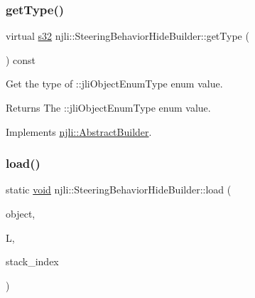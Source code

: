 \mbox{\label{classnjli_1_1_steering_behavior_hide_builder_a12a25b19b54be304480aa0706dd87894}} 
\subsubsection{\texorpdfstring{get\+Type()}{getType()}}
{\footnotesize\ttfamily virtual \mbox{\hyperlink{_util_8h_aa62c75d314a0d1f37f79c4b73b2292e2}{s32}} njli\+::\+Steering\+Behavior\+Hide\+Builder\+::get\+Type (\begin{DoxyParamCaption}{ }\end{DoxyParamCaption}) const\hspace{0.3cm}{\ttfamily [virtual]}}

Get the type of \+::jli\+Object\+Enum\+Type enum value.

\begin{DoxyReturn}{Returns}
The \+::jli\+Object\+Enum\+Type enum value. 
\end{DoxyReturn}


Implements \mbox{\hyperlink{classnjli_1_1_abstract_builder_abb4a8161cd71be12807fe85864b67050}{njli\+::\+Abstract\+Builder}}.

\mbox{\label{classnjli_1_1_steering_behavior_hide_builder_a5b64fbc1b6b0182ae7a2d27983315e66}} 
\subsubsection{\texorpdfstring{load()}{load()}}
{\footnotesize\ttfamily static \mbox{\hyperlink{_thread_8h_af1e856da2e658414cb2456cb6f7ebc66}{void}} njli\+::\+Steering\+Behavior\+Hide\+Builder\+::load (\begin{DoxyParamCaption}\item[{\mbox{\hyperlink{classnjli_1_1_steering_behavior_hide_builder}{Steering\+Behavior\+Hide\+Builder}} \&}]{object,  }\item[{lua\+\_\+\+State $\ast$}]{L,  }\item[{int}]{stack\+\_\+index }\end{DoxyParamCaption})\hspace{0.3cm}{\ttfamily [static]}}

